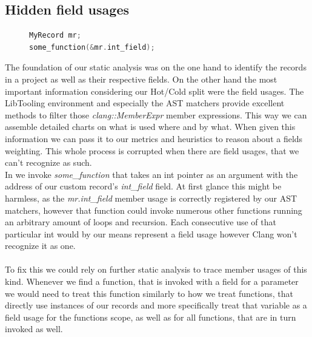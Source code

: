 \subsection{Hidden field usages}\label{hidden_field_usages}
\begin{figure}
\vspace{-20pt}
\begin{lstlisting}[language=C++,name={Simple example of how to hide a field usage from the LibTooling API},label={hidden_field_usage}]
MyRecord mr;
some_function(&mr.int_field);
\end{lstlisting}
\end{figure}
The foundation of our static analysis was on the one hand to identify the records in a project as well as their respective fields. On the other hand the most important information considering our Hot/Cold split were the field usages. The LibTooling environment and especially the AST matchers provide excellent methods to filter those \textit{clang::MemberExpr} member expressions. This way we can assemble detailed charts on what is used where and by what. When given this information we can pass it to our metrics and heuristics to reason about a fields weighting. This whole process is corrupted when there are field usages, that we can't recognize as such.\\
In  we invoke \textit{some\_function} that takes an int pointer as an argument with the address of our custom record's \textit{int\_field} field. At first glance this might be harmless, as the \textit{mr.int\_field} member usage is correctly registered by our AST matchers, however that function could invoke numerous other functions running an arbitrary amount of loops and recursion. Each consecutive use of that particular int would by our means represent a field usage however Clang won't recognize it as one.\\\\
To fix this we could rely on further static analysis to trace member usages of this kind. Whenever we find a function, that is invoked with a field for a parameter we would need to treat this function similarly to how we treat functions, that directly use instances of our records and more specifically treat that variable as a field usage for the functions scope, as well as for all functions, that are in turn invoked as well.

